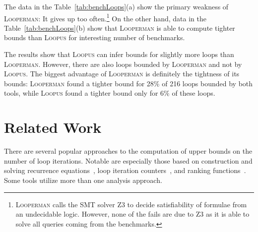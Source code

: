 \documentclass[10pt,a4paper]{article}
\newcommand{\todo}[1]{{\color{red}~#1~}}
\renewcommand{\todo}[1]{}
\newcommand{\Looperman}{\textsc{Looperman}\xspace}
\newcommand{\Loopus}{\textsc{Loopus}\xspace}
\begin{document}
The data in the Table~\ref{tab:benchLoops}(a) show the primary
weakness of \Looperman: It gives up too often.\footnote{\Looperman
  calls the SMT solver Z3 to decide satisfiability of formulae from an
  undecidable logic. However, none of the fails are due to Z3 as it is
  able to solve all queries coming from the benchmarks.} On the other
hand, data in the Table~\ref{tab:benchLoops}(b) show that \Looperman
is able to compute tighter bounds than \Loopus for interesting number
of benchmarks.  
\todo{V tabulkach nesedi cisla: Loopus je lepsi 9x
  asymptoticky na celych programech a jen 7x na cyklech? To je asi
  blbost.}

The results show that \Loopus can infer bounds for slightly more loops
than \Looperman. However, there are also loops bounded by \Looperman
and not by \Loopus. The biggest advantage of \Looperman is definitely
the tightness of its bounds: \Looperman found a tighter bound for
28\% of 216 loops bounded by both tools, while \Loopus found a
tighter bound only for 6\% of these loops.







\section{Related Work}\label{sec:rw}

There are several popular approaches to the computation of upper bounds on
the number of loop iterations. Notable are especially those based on
construction and solving recurrence equations~\cite{PUBS2008, PUBS2007,
  rTuBound2012, ABC}, loop iteration counters~\cite{ABC,Gulwani2009}, and
ranking
functions~\cite{Rank2010,KoAT2014,Loopus2015,Loopus2014,Loopus2011}. Some
tools utilize more than one analysis approach.
\end{document}
